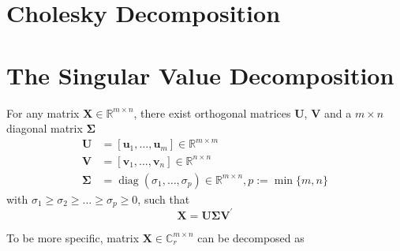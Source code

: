 \documentclass[14pt]{article}
\theoremstyle{definition}
\theoremstyle{remark}
\begin{document}
\headrule

\section{Cholesky Decomposition}



\headrule

\section{The Singular Value Decomposition}
For any matrix $\mathbf{X} \in \mathbb{R}^{m \times n}$, there exist orthogonal matrices $\mathbf{U}$,
$\mathbf{V}$ and a $m \times n$ diagonal matrix $\boldsymbol{\Sigma}$
$$
    \begin{aligned}
        \mathbf{U}          & =\left[\mathbf{u}_{1}, \ldots, \mathbf{u}_{m}\right] \in \mathbb{R}^{m \times m}                              \\
        \mathbf{V}          & =\left[\mathbf{v}_{1}, \ldots, \mathbf{v}_{n}\right] \in \mathbb{R}^{n \times n}                              \\
        \boldsymbol{\Sigma} & =\operatorname{diag}\left(\sigma_{1}, \ldots, \sigma_{p}\right) \in \mathbb{R}^{m \times n}, p:=\min \{m, n\}
    \end{aligned}
$$
with $\sigma_{1} \geq \sigma_{2} \geq \ldots \geq \sigma_{p} \geq 0$, such that
$$
    \mathbf{X}=\mathbf{U} \boldsymbol{\Sigma} \mathbf{V}^{\prime}
$$

To be more specific, matrix $\mathbf{X} \in \mathbb{C}_r^{m \times n}$ can be decomposed as
\end{document}

